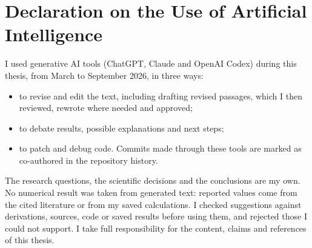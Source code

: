 \chapter{Declaration on the Use of Artificial Intelligence}
\label{app:ai-declaration}

I used generative AI tools (ChatGPT, Claude and OpenAI Codex) during this thesis, from
March to September 2026, in three ways:
\begin{itemize}
  \item to revise and edit the text, including drafting revised passages, which I then
        reviewed, rewrote where needed and approved;
  \item to debate results, possible explanations and next steps;
  \item to patch and debug code. Commits made through these tools are marked as
        co-authored in the repository history.
\end{itemize}

The research questions, the scientific decisions and the conclusions are my own. No
numerical result was taken from generated text: reported values come from the cited
literature or from my saved calculations. I checked suggestions against derivations,
sources, code or saved results before using them, and rejected those I could not support.
I take full responsibility for the content, claims and references of this thesis.

\clearpage
